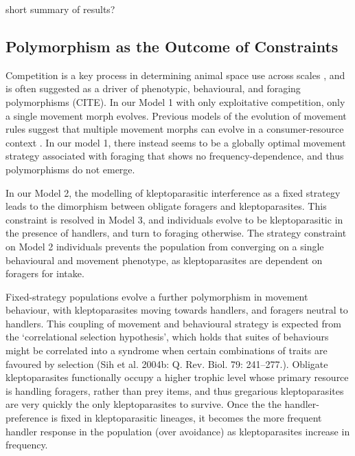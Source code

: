 \documentclass[11pt]{article}
\begin{document}
short summary of results?

\subsection{Polymorphism as the Outcome of Constraints}

Competition is a key process in determining animal space use across scales \cite{fretwell1970, vandermeer1997}, and is often suggested as a driver of phenotypic, behavioural, and foraging polymorphisms (CITE).
In our Model 1 with only exploitative competition, only a single movement morph evolves.
Previous models of the evolution of movement rules suggest that multiple movement morphs can evolve in a consumer-resource context \citep[][Netz et al. in prep.]{getz2015}.
In our model 1, there instead seems to be a globally optimal movement strategy associated with foraging that shows no frequency-dependence, and thus polymorphisms do not emerge.

In our Model 2, the modelling of kleptoparasitic interference as a fixed strategy leads to the dimorphism between obligate foragers and kleptoparasites.
This constraint is resolved in Model 3, and individuals evolve to be kleptoparasitic in the presence of handlers, and turn to foraging otherwise.
The strategy constraint on Model 2 individuals prevents the population from converging on a single behavioural and movement phenotype, as kleptoparasites are dependent on foragers for intake.

Fixed-strategy populations evolve a further polymorphism in movement behaviour, with kleptoparasites moving towards handlers, and foragers neutral to handlers.
This coupling of movement and behavioural strategy is expected from the `correlational selection hypothesis', which holds that suites of behaviours might be correlated into a syndrome when certain combinations of traits are favoured by selection (Sih et al. 2004b: Q. Rev. Biol. 79: 241–277.).
Obligate kleptoparasites functionally occupy a higher trophic level whose primary resource is handling foragers, rather than prey items, and thus gregarious kleptoparasites are very quickly the only kleptoparasites to survive.
Once the the handler-preference is fixed in kleptoparasitic lineages, it becomes the more frequent handler response in the population (over avoidance) as kleptoparasites increase in frequency.
\end{document}
